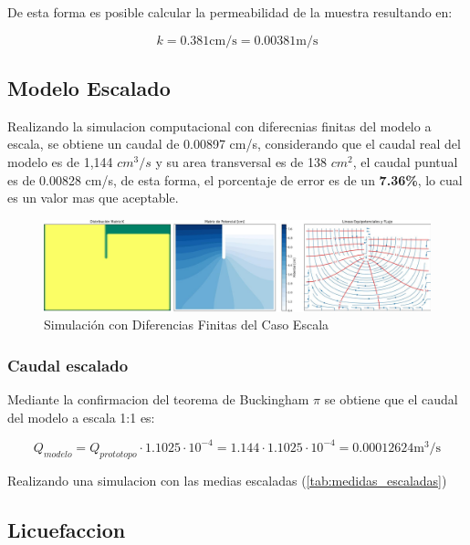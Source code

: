 De esta forma es posible calcular la permeabilidad de la muestra resultando en:

\begin{equation}
    k = 0.381 \text{cm/s} = 0.00381 \text{m/s}
\end{equation}

\subsection{Modelo Escalado}

Realizando la simulacion computacional con diferecnias finitas del modelo a escala, se obtiene un caudal de 0.00897 cm/s, considerando que el caudal real del modelo es de 1,144 $cm^3/s$ y su area transversal es de 138 $cm^2$, el caudal puntual
es de 0.00828 cm/s, de esta forma, el porcentaje de error es de un \textbf{7.36\%}, lo cual es un valor mas que aceptable.

\begin{figure}[H]
    \centering
    \includegraphics[width=1\textwidth]{GRAFICOS/laplace_escala_cm.jpg}
    \caption{Simulación con Diferencias Finitas del Caso Escala}
    \label{fig:maqueta_caso_1}
\end{figure}

\subsubsection{Caudal escalado}

Mediante la confirmacion del teorema de Buckingham $\pi$ se obtiene que el caudal del modelo a escala 1:1 es:

\begin{equation}
    Q_{modelo} = Q_{prototopo} \cdot 1.1025 \cdot 10^{-4} = 1.144 \cdot 1.1025 \cdot 10^{-4} = 0.00012624 \text{m}^3/\text{s}
\end{equation}

Realizando una simulacion con las medias escaladas (\ref{tab:medidas_escaladas})


\newpage
\subsection{Licuefaccion}

